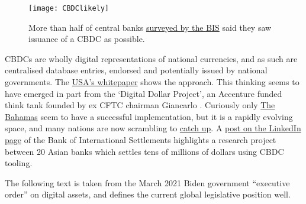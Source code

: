 \begin{figure}
  \centering
    \texttt{[image: CBDClikely]}
  \caption{More than half of central banks \href{https://www.bis.org/publ/bppdf/bispap125.htm}{surveyed by the BIS} said they saw issuance of a CBDC as possible.}
  \label{fig:CBDClikely}
\end{figure}
CBDCs are wholly digital representations of national currencies, and as such are centralised database entries, endorsed and potentially issued by national governments. The \href{https://www.federalreserve.gov/publications/files/money-and-payments-20220120.pdf}{USA's whitepaper} shows the approach. This thinking seems to have emerged in part from the `Digital Dollar Project', an Accenture funded think tank founded by ex CFTC chairman Giancarlo \cite{giancarlo2021cryptodad}. Curiously only \href{https://www.sanddollar.bs/about}{The Bahamas} seem to have a successful implementation, but it is a rapidly evolving space, and many nations are now scrambling to \href{https://twitter.com/GobiernoMX/status/1476376240873517061}{catch up}. A \href{https://www.linkedin.com/feed/update/urn:li:activity:6980330210030145536/}{post on the LinkedIn page} of the Bank of International Settlements highlights a research project between 20 Asian banks which settles tens of millions of dollars using CBDC tooling.\par
The following text is taken from the March 2021 Biden government ``executive order'' on digital assets, and defines the current global legislative position well.\\

